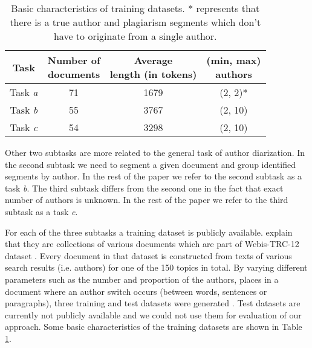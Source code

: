 \documentclass[10pt, a4paper]{article}
\begin{document}
\begin{table}
	\caption{Basic characteristics of training datasets. * represents that there is a true author and plagiarism segments which don't have to originate from a single author.}
	\label{table-1}
	\begin{center}
		\begin{tabular}{cccc}
			\toprule
			Task & \thead{Number of \\ documents} & \thead{Average \\ length (in tokens)} & \thead{(min, max)\\authors} \\
			\midrule
			Task \emph{a} & 71 & 1679 & (2, 2)*\\
			Task \emph{b} & 55 & 3767 & (2, 10)\\
			Task \emph{c} & 54 & 3298 & (2, 10)\\
			\bottomrule
		\end{tabular}
	\end{center}
\end{table}

Other two subtasks are more related to the general task of author diarization. In the second subtask we need to segment a given document and group identified segments by author. In the rest of the paper we refer to the second subtask as a task \emph{b}. The third subtask differs from the second one in the fact that exact number of authors is unknown. In the rest of the paper we refer to the third subtask as a task \emph{c}.

For each of the three subtasks a training dataset is publicly available\footnotemark[1]. \citet{rosso-2016} explain that they are collections of various documents which are part of Webis-TRC-12 dataset \citep{potthast-2013}. Every document in that dataset is constructed from texts of various search results (i.e. authors) for one of the 150 topics in total. By varying different parameters such as the number and proportion of the authors, places in a document where an author switch occurs (between words, sentences or paragraphs), three training and test datasets were generated \citep{rosso-2016}. Test datasets are currently not publicly available and we could not use them for evaluation of our approach. Some basic characteristics of the training datasets are shown in Table \ref{table-1}.

\end{document}
